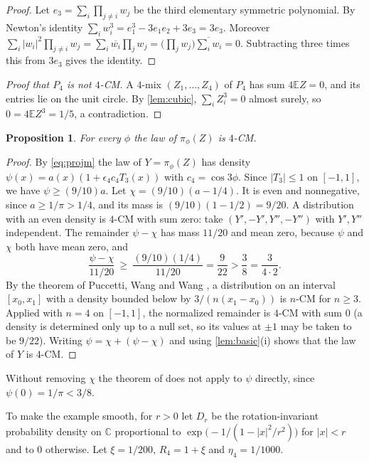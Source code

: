 \documentclass[11pt]{article}
\newtheorem{proposition}[theorem]{Proposition}
\theoremstyle{definition}
\theoremstyle{remark}
\newcommand{\C}{\mathbb{C}}
\newcommand{\E}{\mathbb{E}}
\begin{document}
\begin{proof}
Let $e_3=\sum_i\prod_{j\ne i}w_j$ be the third elementary symmetric polynomial. By Newton's identity
$\sum_iw_i^3=e_1^3-3e_1e_2+3e_3=3e_3$. Moreover
$\sum_i|w_i|^2\prod_{j\ne i}w_j=\sum_i\overline{w_i}\prod_jw_j=\bigl(\prod_jw_j\bigr)\overline{\textstyle\sum_iw_i}=0$.
Subtracting three times this from $3e_3$ gives the identity.
\end{proof}

\begin{proof}[Proof that $P_4$ is not $4$-CM]
A $4$-mix $(Z_1,\dots,Z_4)$ of $P_4$ has sum $4\E Z=0$, and its entries lie on the unit circle. By
\cref{lem:cubic}, $\sum_iZ_i^3=0$ almost surely, so $0=4\E Z^3=1/5$, a contradiction.
\end{proof}

\begin{proposition}\label{prop:proj4}
For every $\phi$ the law of $\pi_\phi(Z)$ is $4$-CM.
\end{proposition}

\begin{proof}
By \eqref{eq:projm} the law of $Y=\pi_\phi(Z)$ has density $\psi(x)=a(x)(1+\epsilon_4 c_4T_3(x))$ with $c_4=\cos3\phi$.
Since $|T_3|\le1$ on $[-1,1]$, we have $\psi\ge(9/10)a$. Let $\chi=(9/10)(a-1/4)$. It is even and nonnegative, since
$a\ge1/\pi>1/4$, and its mass is $(9/10)(1-1/2)=9/20$. A distribution with an even density is $4$-CM with sum zero:
take $(Y',-Y',Y'',-Y'')$ with $Y',Y''$ independent. The remainder $\psi-\chi$ has mass $11/20$ and mean zero, because $\psi$ and
$\chi$ both have mean zero, and
\[
\frac{\psi-\chi}{11/20}\ \ge\ \frac{(9/10)(1/4)}{11/20}=\frac{9}{22}>\frac38=\frac{3}{4\cdot 2}.
\]
By the theorem of Puccetti, Wang and Wang \cite[Theorem~3.4]{PWW13}, a distribution on an interval $[x_0,x_1]$
with a density bounded below by $3/(n(x_1-x_0))$ is $n$-CM for $n\ge3$. Applied with $n=4$ on $[-1,1]$, the
normalized remainder is $4$-CM with sum $0$ (a density is determined only up to a null set, so its values at $\pm1$ may be taken to be $9/22$). Writing $\psi=\chi+(\psi-\chi)$ and using \cref{lem:basic}(i) shows that the law
of $Y$ is $4$-CM.
\end{proof}

Without removing $\chi$ the theorem of \cite{PWW13} does not apply to $\psi$ directly, since $\psi(0)=1/\pi<3/8$.

To make the example smooth, for $r>0$ let $D_r$ be the rotation-invariant probability density on $\C$ proportional to
$\exp\bigl(-1/(1-|x|^2/r^2)\bigr)$ for $|x|<r$ and to $0$ otherwise. Let $\xi=1/200$, $R_4=1+\xi$ and
$\eta_4=1/1000$.
\end{document}
